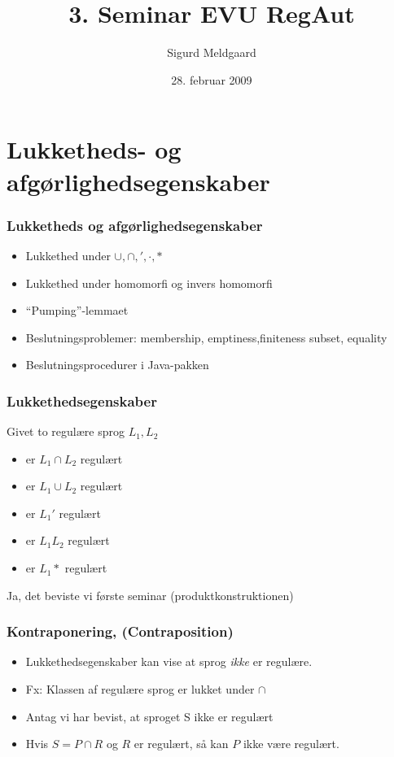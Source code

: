 \documentclass{beamer}
\title{3. Seminar EVU RegAut}
\author{Sigurd Meldgaard}
\date{28. februar 2009}
\begin{document}
\maketitle
\section{Lukketheds- og afgørlighedsegenskaber}
\begin{frame}
  \frametitle{Lukketheds og afgørlighedsegenskaber}
  \begin{itemize}
  \item Lukkethed under $\cup, \cap, ', \cdot, *$ 
  \item Lukkethed under homomorfi og invers 
    homomorfi 
  \item ``Pumping''-lemmaet 
  \item Beslutningsproblemer: membership,  
    emptiness,finiteness subset, equality 
  \item Beslutningsprocedurer i Java-pakken
  \end{itemize}
\end{frame}
\begin{frame}
\frametitle{Lukkethedsegenskaber}
Givet to regulære sprog $L_1, L_2$
\begin{itemize}[<+->]
\item er $L_1 \cap L_2$ regulært
\item er $L_1 \cup L_2$ regulært
\item er $L_1'$ regulært
\item er $L_1L_2$ regulært
\item er $L_1*$ regulært
\end{itemize}
Ja, det beviste vi første seminar (produktkonstruktionen)
\end{frame}
\begin{frame}
\frametitle{Kontraponering, (Contraposition)}
\begin{itemize}[<+->]
\item Lukkethedsegenskaber kan vise at sprog \emph{ikke} er regulære.
\item Fx: Klassen af regulære sprog er lukket under $\cap$
\item Antag vi har bevist, at sproget S ikke er  
regulært 
\item Hvis $S = P \cap R$ og $R$ er regulært, så kan  
$P$ ikke være regulært.
\end{itemize}
\end{frame}
\end{document}
